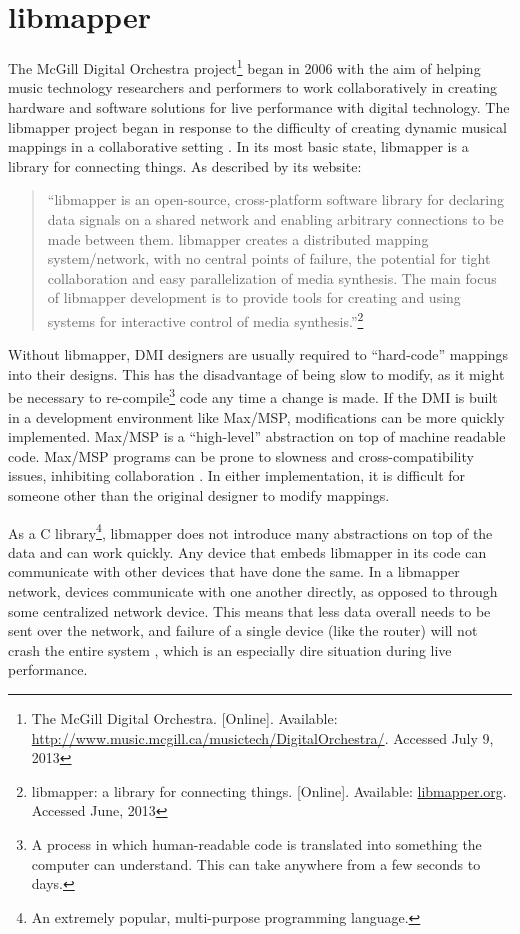 
\chapter{libmapper}

The McGill Digital Orchestra project\footnote{The McGill Digital Orchestra. [Online]. Available: \url{http://www.music.mcgill.ca/musictech/DigitalOrchestra/}. Accessed July 9, 2013} began in 2006 with the aim of helping music technology researchers and performers to work collaboratively in creating hardware and software solutions for live performance with digital technology. The libmapper project began in response to the difficulty of creating dynamic musical mappings in a collaborative setting . In its most basic state, libmapper is a library for connecting things. As described by its website: 

\begin{quote} 
``libmapper is an open-source, cross-platform software library for declaring data signals on a shared network and enabling arbitrary connections to be made between them. libmapper creates a distributed mapping system/network, with no central points of failure, the potential for tight collaboration and easy parallelization of media synthesis. The main focus of libmapper development is to provide tools for creating and using systems for interactive control of media synthesis.''\footnote{libmapper: a library for connecting things. [Online]. Available: \url{libmapper.org}. Accessed June, 2013}
\end{quote}

Without libmapper, DMI designers are usually required to ``hard-code'' mappings into their designs. This has the disadvantage of being slow to modify, as it might be necessary to re-compile\footnote{A process in which human-readable code is translated into something the computer can understand. This can take anywhere from a few seconds to days.} code any time a change is made. If the DMI is built in a development environment like Max/MSP, modifications can be more quickly implemented. Max/MSP is a ``high-level'' abstraction on top of machine readable code. Max/MSP programs can be prone to slowness and cross-compatibility issues, inhibiting collaboration . In either implementation, it is difficult for someone other than the original designer to modify mappings.

As a C library\footnote{An extremely popular, multi-purpose programming language.}, libmapper does not introduce many abstractions on top of the data and can work quickly. Any device that embeds libmapper in its code can communicate with other devices that have done the same. In a libmapper network, devices communicate with one another directly, as opposed to through some centralized network device. This means that less data overall needs to be sent over the network, and failure of a single device (like the router) will not crash the entire system , which is an especially dire situation during live performance.

